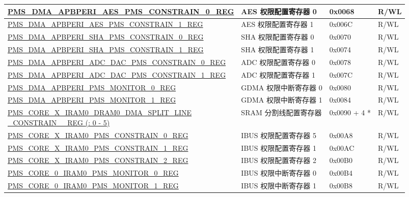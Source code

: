 \begin{longtable}{ | L{9.5cm} | L{7.2cm} | l | L{1.5cm}| }
\hyperref[regdesc:PMSDMAAPBPERIAESPMSCONSTRAIN0REG]{PMS\_DMA\_APBPERI\_AES\_PMS\_CONSTRAIN\_0\_REG} & AES 权限配置寄存器 0 & 0x0068 & R/WL \\ \hline
\hyperref[regdesc:PMSDMAAPBPERIAESPMSCONSTRAIN1REG]{PMS\_DMA\_APBPERI\_AES\_PMS\_CONSTRAIN\_1\_REG} & AES 权限配置寄存器 1 & 0x006C & R/WL \\ \hline
\hyperref[regdesc:PMSDMAAPBPERISHAPMSCONSTRAIN0REG]{PMS\_DMA\_APBPERI\_SHA\_PMS\_CONSTRAIN\_0\_REG} & SHA 权限配置寄存器 0 & 0x0070 & R/WL \\ \hline
\hyperref[regdesc:PMSDMAAPBPERISHAPMSCONSTRAIN1REG]{PMS\_DMA\_APBPERI\_SHA\_PMS\_CONSTRAIN\_1\_REG} & SHA 权限配置寄存器 1 & 0x0074 & R/WL \\ \hline
\hyperref[regdesc:PMSDMAAPBPERIADCDACPMSCONSTRAIN0REG]{PMS\_DMA\_APBPERI\_ADC\_DAC\_PMS\_CONSTRAIN\_0\_REG} & ADC 权限配置寄存器 0 & 0x0078 & R/WL \\ \hline
\hyperref[regdesc:PMSDMAAPBPERIADCDACPMSCONSTRAIN1REG]{PMS\_DMA\_APBPERI\_ADC\_DAC\_PMS\_CONSTRAIN\_1\_REG} & ADC 权限配置寄存器 1 & 0x007C & R/WL \\ \hline
\hyperref[regdesc:PMSDMAAPBPERIPMSMONITOR0REG]{PMS\_DMA\_APBPERI\_PMS\_MONITOR\_0\_REG} & GDMA 权限中断寄存器 0 & 0x0080 & R/WL \\ \hline
\hyperref[regdesc:PMSDMAAPBPERIPMSMONITOR1REG]{PMS\_DMA\_APBPERI\_PMS\_MONITOR\_1\_REG} & GDMA 权限中断寄存器 1 & 0x0084 & R/WL \\ \hline
\hyperref[regdesc:PMSCOREXIRAM0DRAM0DMASPLITLINECONSTRAIN0REG]{PMS\_CORE\_X\_IRAM0\_DRAM0\_DMA\_SPLIT\_LINE\newline\_CONSTRAIN\_\_REG (: 0 - 5)}  & SRAM 分割线配置寄存器  & 0x0090 + 4 *  & R/WL \\ \hline
\hyperref[regdesc:PMSCOREXIRAM0PMSCONSTRAIN0REG]{PMS\_CORE\_X\_IRAM0\_PMS\_CONSTRAIN\_0\_REG} & IBUS 权限配置寄存器 5 & 0x00A8 & R/WL \\ \hline
\hyperref[regdesc:PMSCOREXIRAM0PMSCONSTRAIN1REG]{PMS\_CORE\_X\_IRAM0\_PMS\_CONSTRAIN\_1\_REG} & IBUS 权限配置寄存器 1 & 0x00AC & R/WL \\ \hline
\hyperref[regdesc:PMSCOREXIRAM0PMSCONSTRAIN2REG]{PMS\_CORE\_X\_IRAM0\_PMS\_CONSTRAIN\_2\_REG} & IBUS 权限配置寄存器 2 & 0x00B0 & R/WL \\ \hline
\hyperref[regdesc:PMSCORE0IRAM0PMSMONITOR0REG]{PMS\_CORE\_0\_IRAM0\_PMS\_MONITOR\_0\_REG} & IBUS 权限中断寄存器 0 & 0x00B4 & R/WL \\ \hline
\hyperref[regdesc:PMSCORE0IRAM0PMSMONITOR1REG]{PMS\_CORE\_0\_IRAM0\_PMS\_MONITOR\_1\_REG} & IBUS 权限中断寄存器 1 & 0x00B8 & R/WL \\ \hline

\end{longtable}
